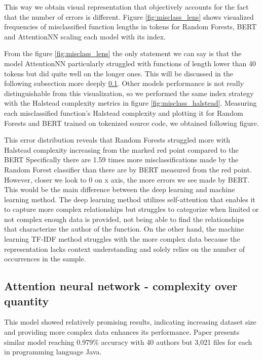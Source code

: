\documentclass[conference]{IEEEtran}
\begin{document}
This way we obtain visual representation that objectively accounts for the fact that the number of errors is different.
Figure \ref{fig:misclass_lens} shows visualized frequencies of misclassified function lengths in tokens for Random Forests, BERT and AttentionNN scaling each 
model with its index.

From the figure \ref{fig:misclass_lens} the only statement we can say is that the model AttentionNN particularly struggled with functions of length lower than 40 tokens
but did quite well on the longer ones. This will be discussed in the following subsection more deeply \ref{subsec:comp_over_quant}.
Other models performance is not really distinguishable from this visualization, so we performed the same index strategy with the Halstead complexity metrics in figure \ref{fig:misclass_halstead}.
Measuring each misclassified function's Halstead complexity and plotting it for Random Forests and BERT trained on tokenized source code, we obtained following figure.

This error distribution reveals that Random Forests struggled more with Halstead complexity increasing from the marked red point compared to the BERT 
Specifically there are 1.59 times more misclassifications made by the Random Forest classifier than there are by BERT measured from the red point.
However, closer we look to 0 on x axis, the more errors we see made by BERT. This would be the main difference between the deep learning and 
machine learning method. The deep learning method utilizes self-attention that enables it to capture more complex relationships but struggles
to categorize when limited or not complex enough data is provided, not being able to find the relationships that characterize the author of the function. 
On the other hand, the machine learning TF-IDF method struggles with the more complex data because the representation lacks context understanding and solely 
relies on the number of occurrences in the sample.

\subsection{Attention neural network - complexity over quantity}  \label{subsec:comp_over_quant}

This model showed relatively promising results, indicating increasing dataset size and providing more complex data enhances its performance.
Paper \cite{pbnn} presents similar model reaching 0.979\% accuracy with 40 authors but 3,021 files for each in programming language Java.
\end{document}
